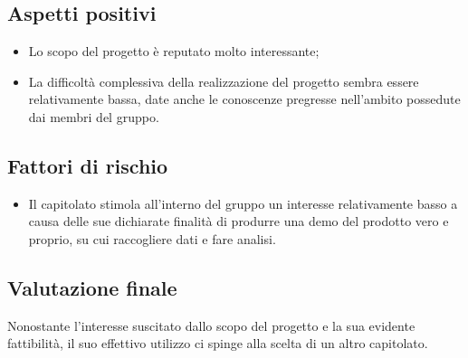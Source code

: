 \documentclass[openany,12pt,a4paper]{report}
\begin{document}
	\subsection{Aspetti positivi}
	
	\begin{itemize}
		\item Lo scopo del progetto è reputato molto interessante;
		
		\item La difficoltà complessiva della realizzazione del progetto sembra essere relativamente bassa, date anche le conoscenze pregresse nell'ambito possedute dai membri del gruppo.
	\end{itemize}
	
	\subsection{Fattori di rischio}
	
	\begin{itemize}
		\item Il capitolato stimola all'interno del gruppo un interesse relativamente basso a causa delle sue dichiarate finalità di produrre una demo del prodotto vero e proprio, su cui raccogliere dati e fare analisi.
	\end{itemize}
	
	\subsection{Valutazione finale}
	
	Nonostante l'interesse suscitato dallo scopo del progetto e la sua evidente fattibilità, il suo effettivo utilizzo ci spinge alla scelta di un altro capitolato.
	
\end{document}
